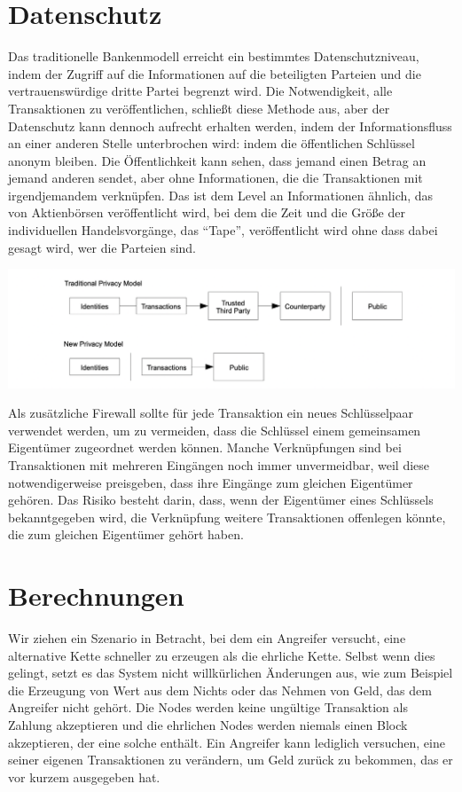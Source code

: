 \documentclass[10pt]{article}
\begin{document}
	\newpage
	
	\section{Datenschutz}
	
	Das traditionelle Bankenmodell erreicht ein bestimmtes Datenschutzniveau, indem der Zugriff auf die Informationen auf die beteiligten Parteien und die vertrauenswürdige dritte Partei begrenzt wird. Die Notwendigkeit, alle Transaktionen zu veröffentlichen, schließt diese Methode aus, aber der Datenschutz kann dennoch aufrecht erhalten werden, indem der Informationsfluss an einer anderen Stelle unterbrochen wird: indem die öffentlichen Schlüssel anonym bleiben. Die Öffentlichkeit kann sehen, dass jemand einen Betrag an jemand anderen sendet, aber ohne Informationen, die die Transaktionen mit irgendjemandem verknüpfen. Das ist dem Level an Informationen ähnlich, das von Aktienbörsen veröffentlicht wird, bei dem die Zeit und die Größe der individuellen Handelsvorgänge, das “Tape”, veröffentlicht wird ohne dass dabei gesagt wird, wer die Parteien sind.
	
	\begin{center}
		\includegraphics[scale=0.3]{pics/privacy.png}
	\end{center}
	
	Als zusätzliche Firewall sollte für jede Transaktion ein neues Schlüsselpaar verwendet werden, um zu vermeiden, dass die Schlüssel einem gemeinsamen Eigentümer zugeordnet werden können. Manche Verknüpfungen sind bei Transaktionen mit mehreren Eingängen noch immer unvermeidbar, weil diese notwendigerweise preisgeben, dass ihre Eingänge zum gleichen Eigentümer gehören. Das Risiko besteht darin, dass, wenn der Eigentümer eines Schlüssels bekanntgegeben wird, die Verknüpfung weitere Transaktionen offenlegen könnte, die zum gleichen Eigentümer gehört haben.
	
	\section{Berechnungen}
	
	Wir ziehen ein Szenario in Betracht, bei dem ein Angreifer versucht, eine alternative Kette schneller zu erzeugen als die ehrliche Kette. Selbst wenn dies gelingt, setzt es das System nicht willkürlichen Änderungen aus, wie zum Beispiel die Erzeugung von Wert aus dem Nichts oder das Nehmen von Geld, das dem Angreifer nicht gehört. Die Nodes werden keine ungültige Transaktion als Zahlung akzeptieren und die ehrlichen Nodes werden niemals einen Block akzeptieren, der eine solche enthält. Ein Angreifer kann lediglich versuchen, eine seiner eigenen Transaktionen zu verändern, um Geld zurück zu bekommen, das er vor kurzem ausgegeben hat.
\end{document}
